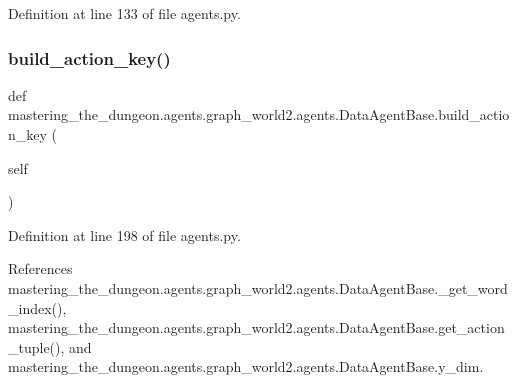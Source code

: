 Definition at line 133 of file agents.\+py.

\mbox{\label{classmastering__the__dungeon_1_1agents_1_1graph__world2_1_1agents_1_1DataAgentBase_a1f73b4d45203915df4938899046ff0eb}} 
\subsubsection{\texorpdfstring{build\+\_\+action\+\_\+key()}{build\_action\_key()}}
{\footnotesize\ttfamily def mastering\+\_\+the\+\_\+dungeon.\+agents.\+graph\+\_\+world2.\+agents.\+Data\+Agent\+Base.\+build\+\_\+action\+\_\+key (\begin{DoxyParamCaption}\item[{}]{self }\end{DoxyParamCaption})}



Definition at line 198 of file agents.\+py.



References mastering\+\_\+the\+\_\+dungeon.\+agents.\+graph\+\_\+world2.\+agents.\+Data\+Agent\+Base.\+\_\+get\+\_\+word\+\_\+index(), mastering\+\_\+the\+\_\+dungeon.\+agents.\+graph\+\_\+world2.\+agents.\+Data\+Agent\+Base.\+get\+\_\+action\+\_\+tuple(), and mastering\+\_\+the\+\_\+dungeon.\+agents.\+graph\+\_\+world2.\+agents.\+Data\+Agent\+Base.\+y\+\_\+dim.

